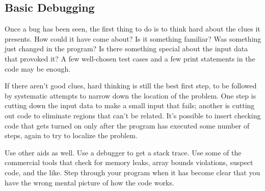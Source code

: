 \documentclass[draftclsnofoot,journal,onecolumn,12pt]{IEEEtran}
\begin{document}
\subsection{Basic Debugging}

Once a bug has been seen, the first thing to do is to think hard about the clues it presents. How could it have come about? Is it something familiar? Was something just changed in the program? Is there something special about the input data that provoked it? A few well-chosen test cases and a few print statements in the code may be enough.

If there aren't good clues, hard thinking is still the best first step, to be followed by systematic attempts to narrow down the location of the problem. One step is cutting down the input data to make a small input that fails; another is cutting out code to eliminate regions that can't be related. It's possible to insert checking code that gets turned on only after the program has executed some number of steps, again to try to localize the problem.

Use other aids as well. Use a debugger to get a stack trace. Use some of the commercial tools that check for memory leaks, array bounds violations, suspect code, and the like. Step through your program when it has become clear that you have the wrong mental picture of how the code works.
\end{document}
